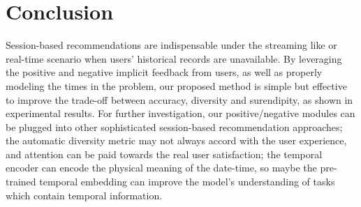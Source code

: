 \section{Conclusion}
Session-based recommendations are indispensable under the streaming like 
or real-time scenario when users' historical records are unavailable. 
By leveraging the positive and negative implicit feedback from users, as well
as properly modeling the times in the problem, 
our proposed method is simple but effective to improve the 
trade-off between accuracy, diversity and surendipity, 
as shown in experimental results. For further investigation, our positive/negative modules can be plugged into other sophisticated 
session-based recommendation approaches; the automatic diversity metric may not always accord with the user experience, and attention can be paid towards the real user satisfaction; the temporal encoder can encode the physical meaning of the date-time, so maybe the pre-trained temporal embedding can improve the model's understanding of tasks which contain temporal information.
